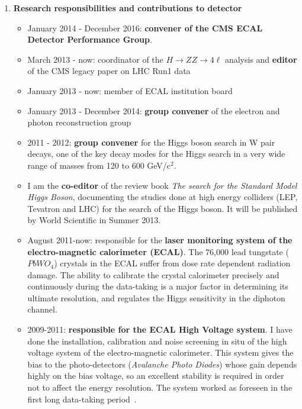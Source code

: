 \documentclass[11pt,twoside,a4paper]{article}
\begin{document}
\begin{enumerate}
\item {\bf Research responsibilities and contributions to detector}
  
  \begin{itemize}
    \item January 2014 - December 2016: {\bf convener of the CMS ECAL
      Detector Performance Group}.

  \item March 2013 - now: coordinator of the $H \to ZZ\to4\ell$
    analysis and {\bf editor} of the CMS legacy paper on LHC Run1 data

  \item January 2013 - now: member of ECAL institution board
    
  \item January 2013 - December 2014: {\bf group convener} of the
    electron and photon reconstruction group
    
  \item 2011 - 2012: {\bf group convener} for the Higgs boson search
    in W pair decays, one of the key decay modes for the Higgs search
    in a very wide range of masses from 120 to 600 GeV/c$^2$. 

  \item I am the {\bf co-editor} of the review book {\it The search
    for the Standard Model Higgs Boson}, documenting the studies done
    at high energy colliders (LEP, Tevatron and LHC) for the search of
    the Higgs boson. It will be published by World Scientific in
    Summer 2013.
    
  \item August 2011-now: responsible for the {\bf laser monitoring
    system of the electro-magnetic calorimeter (ECAL)}. The 76,000
    lead tungstate ($PbWO_4$) crystals in the ECAL suffer from dose
    rate dependent radiation damage. The ability to calibrate the
    crystal calorimeter precisely and continuously during the
    data-taking is a major factor in determining its ultimate
    resolution, and regulates the Higgs sensitivity in the diphoton
    channel.

  \item 2009-2011: {\bf responsible for the ECAL High Voltage
    system}. I have done the installation, calibration and noise
    screening in situ of the high voltage system of the
    electro-magnetic calorimeter.  This system gives the bias to the
    photo-detectors ({\it Avalanche Photo Diodes}) whose gain depends
    highly on the bias voltage, so an excellent stability is required
    in order not to affect the energy resolution. The system worked as
    foreseen in the first long data-taking period~\cite{ecal_craft}.


\end{itemize}
\end{enumerate}
\end{document}
